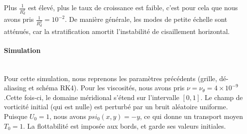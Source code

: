 Plus $\frac{1}{R_d^2}$ est élevé, plus le taux de croissance est faible, c'est pour cela que nous avons pris $\frac{1}{R_d^2} = 10^{-2}$. De manière générale, les modes de petite échelle sont atténués, car la stratification amortit l'instabilité de cisaillement horizontal.
\paragraph{Simulation}~\\
Pour cette simulation, nous reprenons les paramètres précédents (grille, dé-aliasing et schéma RK4). Pour les viscosités, nous avons pris $\nu = \nu_{\theta} = 4\times 10^{-9}$.Cette fois-ci, le domaine méridional s'étend sur l'intervalle $[0, 1]$. Le champ de vorticité initial (qui est nulle) est perturbé par un bruit aléatoire uniforme. Puisque $U_0 = 1$, nous avons $psi_0(x, y) = -y$, ce qui donne un transport moyen $T_0 = 1$. La flottabilité est imposée aux bords, et garde ses valeurs initiales.

